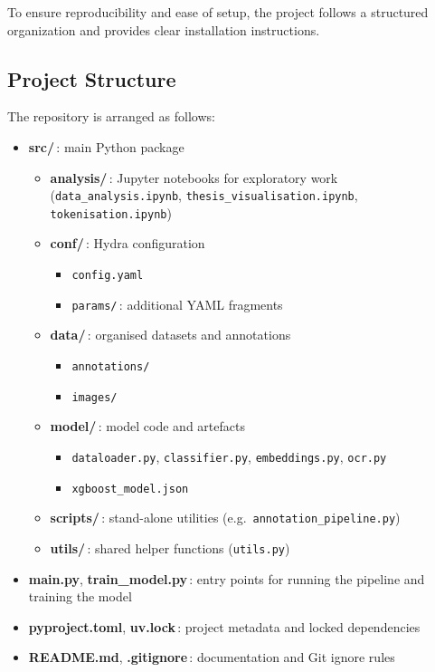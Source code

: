 \documentclass{SGGW-thesis-EN}
\begin{document}
To ensure reproducibility and ease of setup, the project follows a structured organization and provides clear installation instructions.

\subsection{Project Structure}
The repository is arranged as follows:
\begin{itemize}
  \item \textbf{src/}\,: main Python package
    \begin{itemize}
      \item \textbf{analysis/}\,: Jupyter notebooks for exploratory work  
            (\texttt{data\_analysis.ipynb}, \texttt{thesis\_visualisation.ipynb}, \texttt{tokenisation.ipynb})
      \item \textbf{conf/}\,: Hydra configuration
        \begin{itemize}
          \item \texttt{config.yaml}
          \item \texttt{params/}\,: additional YAML fragments
        \end{itemize}
      \item \textbf{data/}\,: organised datasets and annotations
        \begin{itemize}
          \item \texttt{annotations/}
          \item \texttt{images/}
        \end{itemize}
      \item \textbf{model/}\,: model code and artefacts
        \begin{itemize}
          \item \texttt{dataloader.py}, \texttt{classifier.py}, \texttt{embeddings.py}, \texttt{ocr.py}
          \item \texttt{xgboost\_model.json}
        \end{itemize}
      \item \textbf{scripts/}\,: stand-alone utilities (e.g.\ \texttt{annotation\_pipeline.py})
      \item \textbf{utils/}\,: shared helper functions (\texttt{utils.py})
    \end{itemize}

  \item \textbf{main.py}, \textbf{train\_model.py}\,: entry points for running the pipeline and training the model
  \item \textbf{pyproject.toml}, \textbf{uv.lock}\,: project metadata and locked dependencies
  \item \textbf{README.md}, \textbf{.gitignore}\,: documentation and Git ignore rules
\end{itemize}
\end{document}
